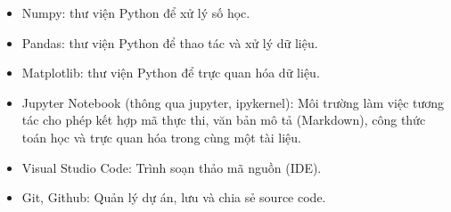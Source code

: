 \begin{itemize}
    \item Numpy: thư viện Python để xử lý số học.
    \item Pandas: thư viện Python để thao tác và xử lý dữ liệu.
    \item Matplotlib: thư viện Python để trực quan hóa dữ liệu.
    \item Jupyter Notebook (thông qua jupyter, ipykernel): Môi trường làm việc tương tác cho phép kết hợp mã thực thi, văn bản mô tả (Markdown), công thức toán học và trực quan hóa trong cùng một tài liệu.
    \item Visual Studio Code: Trình soạn thảo mã nguồn (IDE). 
    \item Git, Github: Quản lý dự án, lưu và chia sẻ source code.
\end{itemize}

\pagebreak